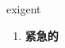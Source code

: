 
\begin{frame}
{\huge exigent}
\begin{center}
\begin{enumerate}\Large
  \item \textbf{紧急的}
\end{enumerate}
\end{center}
\end{frame}
